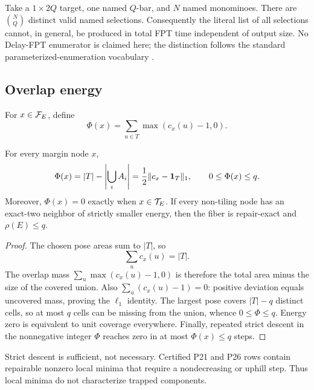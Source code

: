 \begin{example}
Take a \(1\times2Q\) target, one named \(Q\)-bar, and \(N\) named monominoes.
There are \(\binom NQ\) distinct valid named selections.  Consequently the
literal list of all selections cannot, in general, be produced in total FPT
time independent of output size.  No Delay-FPT enumerator is claimed here;
the distinction follows the standard parameterized-enumeration vocabulary
\cite{CreignouEtAl2017}.
\end{example}
\subsection{Overlap energy}

For \(x\in\mathcal F_E\), define
\[
 \Phi(x)=\sum_{u\in T}\max(c_x(u)-1,0).
\]

\begin{proposition}\label{prop:energy}
For every margin node \(x\),
\[
 \Phi(x)
 =|T|-\left|\bigcup_i A_i\right|
 =\frac12\|c_x-\mathbf 1_T\|_1,
 \qquad 0\leq\Phi(x)\leq q.
\]
Moreover, \(\Phi(x)=0\) exactly when \(x\in\mathcal T_E\).  If every non-tiling node
has an exact-two neighbor of strictly smaller energy, then the fiber is
repair-exact and \(\rho(E)\leq q\).
\end{proposition}

\begin{proof}
The chosen pose areas sum to \(|T|\), so
\[
 \sum_u c_x(u)=|T|.
\]
The overlap mass \(\sum_u\max(c_x(u)-1,0)\) is therefore the total area minus
the size of the covered union.  Also
\(\sum_u(c_x(u)-1)=0\): positive deviation equals uncovered mass, proving the
\(\ell_1\) identity.  The largest pose covers \(|T|-q\) distinct cells, so at
most \(q\) cells can be missing from the union, whence \(0\leq\Phi\leq q\).
Energy zero is equivalent to unit coverage everywhere.  Finally, repeated
strict descent in the nonnegative integer \(\Phi\) reaches zero in at most
\(\Phi(x)\leq q\) steps.
\end{proof}

Strict descent is sufficient, not necessary.  Certified P21 and P26 rows
contain repairable nonzero local minima that require a nondecreasing or
uphill step.  Thus local minima do not characterize trapped components.
